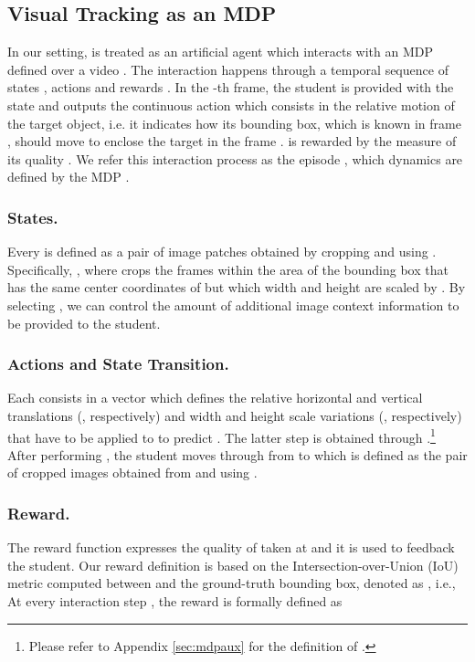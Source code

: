 \documentclass[runningheads]{llncs}
\begin{document}
\subsection{Visual Tracking as an MDP}
\label{sec:votmdp}
In our setting,  is treated as an artificial agent which interacts with an MDP defined over a video . 
The interaction happens through a temporal sequence of states , actions  and rewards . In the -th frame, the student is provided with the state  and outputs the continuous action  which consists in the relative motion of the target object, i.e. it indicates how its bounding box, which is known in frame , should move to enclose the target in the frame .  is rewarded by the measure of its quality . We refer this interaction process as the episode , which dynamics are defined by the MDP 
.

\subsubsection{States.} Every  is defined as a pair of image patches obtained by cropping  and  using .
Specifically, , where  crops the frames  within the area of the bounding box  that has the same center coordinates of  but which width and height are scaled by . By selecting , we can control the amount of additional image context information to be provided to the student. 

\subsubsection{Actions and State Transition.} Each  consists in a vector  which defines the relative horizontal and vertical translations (, respectively) and width and height scale variations (, respectively) that have to be applied to  to predict . The latter step is obtained through .\footnote{Please refer to Appendix \ref{sec:mdpaux} for the definition of .}
After performing , the student moves through  from  to  which is defined as the pair of cropped images obtained from  and  using .

\subsubsection{Reward.} The reward function expresses the quality of  taken at  and it is used to feedback the student. 
Our reward definition is based on the Intersection-over-Union (IoU) metric computed between  and the ground-truth bounding box, denoted as , i.e., 
At every interaction step , the reward is formally defined as
\end{document}
